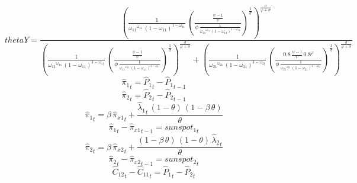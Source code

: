 \begin{dmath*}
thetaY = \frac{\left(\frac{1}{{{\omega_{11}}}^{{{\omega_{11}}}}\, \left(1-{{\omega_{11}}}\right)^{1-{{\omega_{11}}}}}\, \left(\frac{\frac{{{\psi}}-1}{{{\psi}}}}{{{\phi}}\, \frac{1}{{{\omega_{11}}}^{{{\omega_{11}}}}\, \left(1-{{\omega_{11}}}\right)^{1-{{\omega_{11}}}}}}\right)^{\frac{1}{{{\sigma}}}}\right)^{\frac{{{\sigma}}}{{{\varphi}}+{{\sigma}}}}}{\left(\frac{1}{{{\omega_{11}}}^{{{\omega_{11}}}}\, \left(1-{{\omega_{11}}}\right)^{1-{{\omega_{11}}}}}\, \left(\frac{\frac{{{\psi}}-1}{{{\psi}}}}{{{\phi}}\, \frac{1}{{{\omega_{11}}}^{{{\omega_{11}}}}\, \left(1-{{\omega_{11}}}\right)^{1-{{\omega_{11}}}}}}\right)^{\frac{1}{{{\sigma}}}}\right)^{\frac{{{\sigma}}}{{{\varphi}}+{{\sigma}}}}+\left(\frac{1}{{{\omega_{21}}}^{{{\omega_{21}}}}\, \left(1-{{\omega_{21}}}\right)^{1-{{\omega_{21}}}}}\, \left(\frac{0.8\, \frac{{{\psi}}-1}{{{\psi}}}\, 0.8^{{{\varphi}}}}{{{\phi}}\, \frac{1}{{{\omega_{21}}}^{{{\omega_{21}}}}\, \left(1-{{\omega_{21}}}\right)^{1-{{\omega_{21}}}}}}\right)^{\frac{1}{{{\sigma}}}}\right)^{\frac{{{\sigma}}}{{{\varphi}}+{{\sigma}}}}}
\end{dmath*}
\begin{dmath}
{{\hat{\pi}_{1}}}_{t}={{\hat{P}_{1}}}_{t}-{{\hat{P}_{1}}}_{t-1}
\end{dmath}
\begin{dmath}
{{\hat{\pi}_{2}}}_{t}={{\hat{P}_{2}}}_{t}-{{\hat{P}_{2}}}_{t-1}
\end{dmath}
\begin{dmath}
{{\hat{\pi}_{1}}}_{t}={{\beta}}\, {{\hat{\pi}_{x1}}}_{t}+\frac{{{\hat{\lambda}_{1}}}_{t}\, \left(1-{{\theta}}\right)\, \left(1-{{\beta}}\, {{\theta}}\right)}{{{\theta}}}
\end{dmath}
\begin{dmath}
{{\hat{\pi}_{1}}}_{t}-{{\hat{\pi}_{x1}}}_{t-1}={{sunspot_{1}}}_{t}
\end{dmath}
\begin{dmath}
{{\hat{\pi}_{2}}}_{t}={{\beta}}\, {{\hat{\pi}_{x2}}}_{t}+\frac{\left(1-{{\beta}}\, {{\theta}}\right)\, \left(1-{{\theta}}\right)\, {{\hat{\lambda}_{2}}}_{t}}{{{\theta}}}
\end{dmath}
\begin{dmath}
{{\hat{\pi}_{2}}}_{t}-{{\hat{\pi}_{x2}}}_{t-1}={{sunspot_{2}}}_{t}
\end{dmath}
\begin{dmath}
{{\hat{C}_{1 2}}}_{t}-{{\hat{C}_{1 1}}}_{t}={{\hat{P}_{1}}}_{t}-{{\hat{P}_{2}}}_{t}
\end{dmath}

